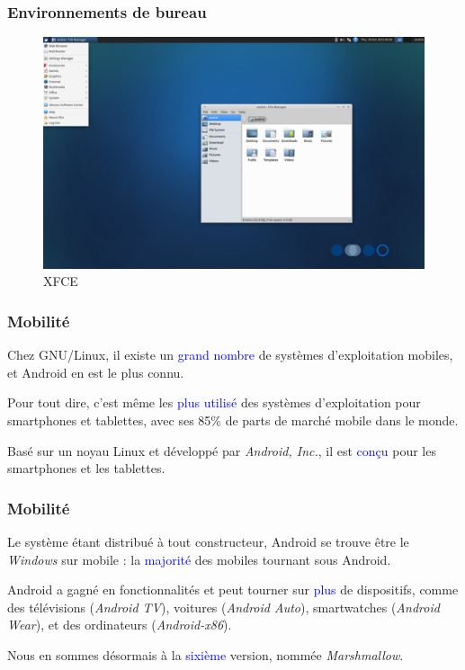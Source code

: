\documentclass[aspectratio=169]{beamer}
\begin{document}
\begin{frame}
  \frametitle{Environnements de bureau}
  \begin{figure}[!h]
    \center
    \includegraphics[scale=0.2]
    {textures/images/unix/desktop_environment/xfce.png}
    \caption{XFCE}
  \end{figure}
\end{frame}

\begin{frame}
  \frametitle{Mobilité}
  Chez GNU/Linux, il existe un \textcolor{blue}{grand nombre} de systèmes
  d'exploitation mobiles, et Android en est le plus connu.

  \hspace{0.5cm}

  Pour tout dire, c'est même les \textcolor{blue}{plus utilisé} des systèmes
d'exploitation pour smartphones et tablettes, avec ses 85\% de parts de marché
mobile dans le monde.

  \hspace{0.5cm}

Basé sur un noyau Linux et développé par \textit{Android, Inc.}, il est
\textcolor{blue}{conçu} pour les smartphones et les tablettes.
\end{frame}

\begin{frame}
  \frametitle{Mobilité}
  Le système étant distribué à tout constructeur, Android se trouve être le
\textit{Windows} sur mobile : la \textcolor{blue}{majorité} des mobiles tournant
sous Android.

  \hspace{0.5cm}

Android a gagné en fonctionnalités et peut tourner sur \textcolor{blue}{plus} de
dispositifs, comme des télévisions (\textit{Android TV}), voitures
(\textit{Android Auto}), smartwatches (\textit{Android Wear}), et des ordinateurs
(\textit{Android-x86}).

  \hspace{0.5cm}

Nous en sommes désormais à la \textcolor{blue}{sixième} version, nommée
\textit{Marshmallow}.
\end{frame}
\end{document}
